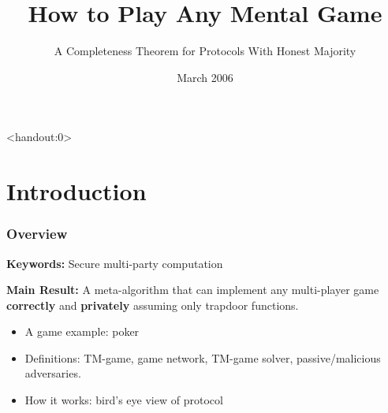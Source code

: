 \documentclass[10pt]{beamer}
\title{How to Play Any Mental Game}
\subtitle{A Completeness Theorem for Protocols With Honest Majority}
\author[[GMR], P. Pham]{[Goldreich, Micali, Wigderson 1987]\\Paul Pham}
\institute{UW CSE}
\date{March 2006}
\begin{document}
\begin{frame}<handout:0>
\titlepage
\end{frame}

\section{Introduction}

\begin{frame}
\frametitle{Overview}

\textbf{Keywords:}
Secure multi-party computation

\textbf{Main Result:}
A meta-algorithm that can implement any multi-player game
\textbf{correctly} and \textbf{privately} assuming only trapdoor functions.

\begin{itemize}
\item A game example: poker
\item Definitions: TM-game, game network, TM-game solver, passive/malicious adversaries.
\item How it works: bird's eye view of protocol
\end{itemize}

\end{frame}

\end{document}
